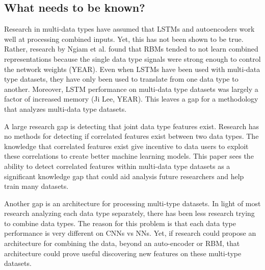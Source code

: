 \subsection{What needs to be known?}

Research in multi-data types have assumed that LSTMs and autoencoders work well at processing combined inputs.  Yet, this has not been shown to be true.  Rather, research by Ngiam et al. found that RBMs tended to not learn combined representations because the single data type signals were strong enough to control the network weights (YEAR).  Even when LSTMs have been used with multi-data type datasets, they have only been used to translate from one data type to another.  Moreover, LSTM performance on multi-data type datasets was largely a factor of increased memory (Ji Lee, YEAR).  This leaves a gap for a methodology that analyzes multi-data type datasets.  

A large research gap is detecting that joint data type features exist.  Research has no methods for detecting if correlated features exist between two data types.  The knowledge that correlated features exist give incentive to data users to exploit these correlations to create better machine learning models.   This paper sees the ability to detect correlated features within multi-data type datasets as a significant knowledge gap that could aid analysis future researchers and help train many datasets.

Another gap is an architecture for processing multi-type datasets. In light of most research analyzing each data type separately, there has been less research trying to combine data types.  The reason for this problem is that each data type performance is very different on CNNs vs NNs.  Yet, if research could propose an architecture for combining the data, beyond an auto-encoder or RBM, that architecture could prove useful discovering new features on these multi-type datasets.
